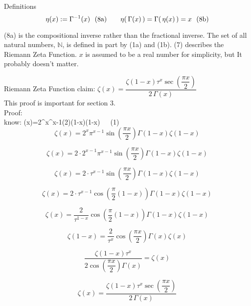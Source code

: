 \documentclass[12pt]{article}
\begin{document}
\begin{section}{Definitions}
	\vspace{-0.065em}\begin{equation}
		\eta(x):=\Gamma^{-1}(x)~~(8\text a)\hspace{2em}\eta(\,\Gamma(x)\,)=\Gamma(\,\eta(x)\,)=x~~(8\text b)
	\end{equation}

	\noindent(8a) is the compositional inverse rather than the fractional inverse. The set of all natural numbers, $\mathbb N$, is defined in part by (1a) and (1b). (7) describes the Riemann Zeta Function. $x$ is assumed to be a real number for simplicity, but It probably doesn't matter.
\end{section}

\pagebreak\begin{section}{Riemann Zeta Function}
	claim: $\zeta(x)=\dfrac{\zeta(1-x)\tau^x\sec\left(\dfrac{\pi x}2\right)}{2\,\Gamma(x)}$\\
	This proof is important for section 3.\\
	Proof:\\
	know: \zeta(x)=2^x\pi^{x-1}\sin\left(2\right)\Gamma(1-x)\zeta(1-x)~~~(1)\\

	\begin{equation}
		\zeta(x)=2^x\pi^{x-1}\sin\left(\dfrac{\pi x}2\right)\Gamma\left(1-x\right)\zeta\left(1-x\right)
	\end{equation}

	\begin{equation}
		\zeta(x)=2\cdot2^{x-1}\pi^{x-1}\sin\left(\dfrac{\pi x}2\right)\Gamma(1-x)\zeta(1-x)
	\end{equation}

	\begin{equation}
		\zeta(x)=2\cdot\tau^{x-1}\sin\left(\dfrac{\pi x}2\right)\Gamma(1-x)\zeta(1-x)
	\end{equation}

	\begin{equation}
		\zeta(x)=2\cdot\tau^{x-1}\cos\left(\dfrac\pi2(1-x)\right)\Gamma(1-x)\zeta(1-x)
	\end{equation}

	\begin{equation}
		\zeta(x)=\dfrac2{\tau^{1-x}}\cos\left(\dfrac\pi2(1-x)\right)\Gamma(1-x)\zeta(1-x)
	\end{equation}

	\begin{equation}
		\zeta(1-x)=\dfrac2{\tau^x}\cos\left(\dfrac{\pi x}2\right)\Gamma(x)\zeta(x)
	\end{equation}

	\begin{equation}
		\dfrac{\zeta(1-x)\tau^x}{2\cos\left(\dfrac{\pi x}2\right)\Gamma(x)}=\zeta(x)
	\end{equation}

	\begin{equation}
		\zeta(x)=\dfrac{\zeta(1-x)\tau^x\sec\left(\dfrac{\pi x}2\right)}{2\,\Gamma(x)}
	\end{equation}

	\noindent\blacksquare
\end{section}
\end{document}
